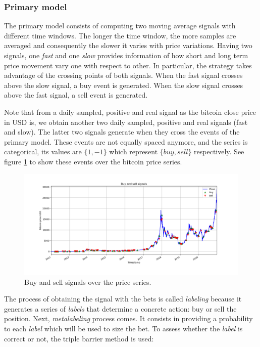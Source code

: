 \subsubsection{Primary model}
\label{sec:methods_pipeline_primary_model}

The primary model consists of computing two moving average signals with
different time windows. The longer the time window, the more samples are
averaged and consequently the slower it varies with price variations. Having two
signals, one \emph{fast} and one \emph{slow} provides information of how short
and long term price movement vary one with respect to other. In particular, the
strategy takes advantage of the crossing points of both signals. When the fast
signal crosses above the slow signal, a buy event is generated. When the slow
signal crosses above the fast signal, a sell event is generated.

Note that from a daily sampled, positive and real signal as the bitcoin close
price in USD is, we obtain another two daily sampled, positive and real signals
(fast and slow). The latter two signals generate when they cross the events of
the primary model. These events are not equally spaced anymore, and the series
is categorical, its values are $\{1, -1\}$ which represent $\{buy, sell\}$
respectively. See figure \ref{fig:buy_and_sell_labels} to show these events over
the bitcoin price series.

\begin{figure}[H]
    \centering
    \includegraphics[width=\textwidth]{methods/images/buy_and_sell_labels.png}
    \caption{Buy and sell signals over the price series.}
    \label{fig:buy_and_sell_labels}
\end{figure}

The process of obtaining the signal with the bets is called \emph{labeling}
because it generates a series of \emph{labels} that determine a concrete action:
buy or sell the position. Next, \emph{metalabeling} process comes. It consists
in providing a probability to each \emph{label} which will be used to size the
bet. To assess whether the \emph{label} is correct or not, the triple barrier
method is used:

